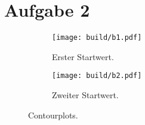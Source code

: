 \section*{Aufgabe 2}
\begin{figure}
  \centering
  \begin{subfigure}{0.49\textwidth}
    \centering
    \texttt{[image: build/b1.pdf]}
    \caption{Erster Startwert.}
    \label{sub:1}
  \end{subfigure}
  \begin{subfigure}{0.49\textwidth}
    \centering
    \texttt{[image: build/b2.pdf]}
    \caption{Zweiter Startwert.}
    \label{sub:1}
  \end{subfigure}
  \caption{Contourplots.}
  \label{fig:1}
\end{figure}
